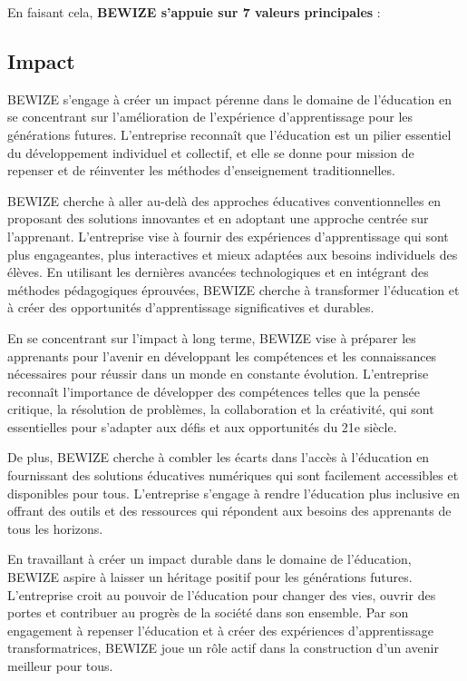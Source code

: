 En faisant cela, \textbf{BEWIZE s’appuie sur 7 valeurs principales} :

\subsection{Impact} 
BEWIZE s'engage à créer un impact pérenne dans le domaine de l'éducation en se concentrant sur l'amélioration de l'expérience d'apprentissage pour les générations futures. L'entreprise reconnaît que l'éducation est un pilier essentiel du développement individuel et collectif, et elle se donne pour mission de repenser et de réinventer les méthodes d'enseignement traditionnelles.

BEWIZE cherche à aller au-delà des approches éducatives conventionnelles en proposant des solutions innovantes et en adoptant une approche centrée sur l'apprenant. L'entreprise vise à fournir des expériences d'apprentissage qui sont plus engageantes, plus interactives et mieux adaptées aux besoins individuels des élèves. En utilisant les dernières avancées technologiques et en intégrant des méthodes pédagogiques éprouvées, BEWIZE cherche à transformer l'éducation et à créer des opportunités d'apprentissage significatives et durables.

En se concentrant sur l'impact à long terme, BEWIZE vise à préparer les apprenants pour l'avenir en développant les compétences et les connaissances nécessaires pour réussir dans un monde en constante évolution. L'entreprise reconnaît l'importance de développer des compétences telles que la pensée critique, la résolution de problèmes, la collaboration et la créativité, qui sont essentielles pour s'adapter aux défis et aux opportunités du 21e siècle.

De plus, BEWIZE cherche à combler les écarts dans l'accès à l'éducation en fournissant des solutions éducatives numériques qui sont facilement accessibles et disponibles pour tous. L'entreprise s'engage à rendre l'éducation plus inclusive en offrant des outils et des ressources qui répondent aux besoins des apprenants de tous les horizons.

En travaillant à créer un impact durable dans le domaine de l'éducation, BEWIZE aspire à laisser un héritage positif pour les générations futures. L'entreprise croit au pouvoir de l'éducation pour changer des vies, ouvrir des portes et contribuer au progrès de la société dans son ensemble. Par son engagement à repenser l'éducation et à créer des expériences d'apprentissage transformatrices, BEWIZE joue un rôle actif dans la construction d'un avenir meilleur pour tous.


